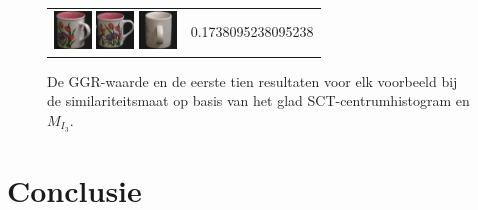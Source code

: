 \begin{figure}[!bp]
\begin{tabular}{m{11cm} | m{3cm} |}
\includegraphics[width=1cm]{coil/beeld-10.eps}
\includegraphics[width=1cm]{coil/beeld-6.eps}
\includegraphics[width=1cm]{coil/beeld-41.eps}
& {\scriptsize 0.1738095238095238}
\\
\end{tabular}
\vspace{5pt}
\caption{\label{fig:results_sct_glad_centrum_histgeb}De GGR-waarde en de eerste tien resultaten voor elk 
voorbeeld bij de similariteitsmaat op basis van het glad SCT-centrumhistogram en $M_{I_3}$.}
\end{figure}


\section{Conclusie}
\label{sectie:conclusie_kleurgeb}

